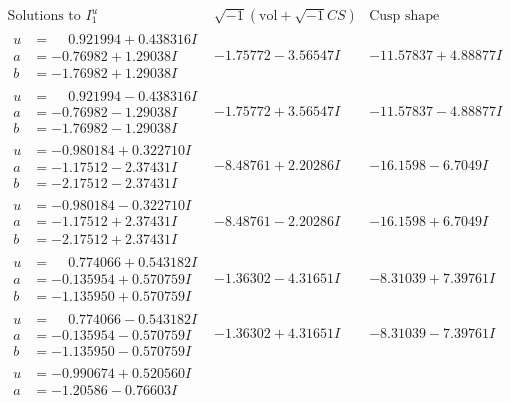\documentclass[1p]{elsarticle_modified}
\theoremstyle{definition}
\newcommand{\I}{\sqrt{-1}}
\begin{document}
$$\begin{array}{c|c|c}  
\text{Solutions to }I^u_{1}& \I (\text{vol} + \sqrt{-1}CS) & \text{Cusp shape}\\
 \hline 
\begin{aligned}
u &= \phantom{-}0.921994 + 0.438316 I \\
a &= -0.76982 + 1.29038 I \\
b &= -1.76982 + 1.29038 I\end{aligned}
 & -1.75772 - 3.56547 I & -11.57837 + 4.88877 I \\ \hline\begin{aligned}
u &= \phantom{-}0.921994 - 0.438316 I \\
a &= -0.76982 - 1.29038 I \\
b &= -1.76982 - 1.29038 I\end{aligned}
 & -1.75772 + 3.56547 I & -11.57837 - 4.88877 I \\ \hline\begin{aligned}
u &= -0.980184 + 0.322710 I \\
a &= -1.17512 - 2.37431 I \\
b &= -2.17512 - 2.37431 I\end{aligned}
 & -8.48761 + 2.20286 I & -16.1598 - 6.7049 I \\ \hline\begin{aligned}
u &= -0.980184 - 0.322710 I \\
a &= -1.17512 + 2.37431 I \\
b &= -2.17512 + 2.37431 I\end{aligned}
 & -8.48761 - 2.20286 I & -16.1598 + 6.7049 I \\ \hline\begin{aligned}
u &= \phantom{-}0.774066 + 0.543182 I \\
a &= -0.135954 + 0.570759 I \\
b &= -1.135950 + 0.570759 I\end{aligned}
 & -1.36302 - 4.31651 I & -8.31039 + 7.39761 I \\ \hline\begin{aligned}
u &= \phantom{-}0.774066 - 0.543182 I \\
a &= -0.135954 - 0.570759 I \\
b &= -1.135950 - 0.570759 I\end{aligned}
 & -1.36302 + 4.31651 I & -8.31039 - 7.39761 I \\ \hline\begin{aligned}
u &= -0.990674 + 0.520560 I \\
a &= -1.20586 - 0.76603 I \\

\end{aligned}
\end{array}$$
\end{document}
